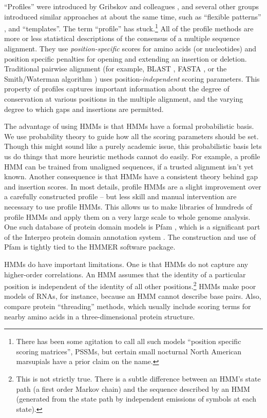 ``Profiles'' were introduced by Gribskov and colleagues
\cite{Gribskov87,Gribskov90}, and several other groups introduced
similar approaches at about the same time, such as ``flexible
patterns'' \cite{Barton90}, and
``templates''\cite{Bashford87,Taylor86}. The term ``profile'' has
stuck.\footnote{There has been some agitation to call all such models
``position specific scoring matrices'', PSSMs, but certain small
nocturnal North American marsupials have a prior claim on the name.}
All of the profile methods are more or less statistical descriptions
of the consensus of a multiple sequence alignment. They use
\emph{position-specific} scores for amino acids (or nucleotides) and
position specific penalties for opening and extending an insertion or
deletion.  Traditional pairwise alignment (for example, BLAST
\cite{Altschul90}, FASTA \cite{Pearson88}, or the Smith/Waterman
algorithm \cite{Smith81}) uses position-{\em independent} scoring
parameters. This property of profiles captures important information
about the degree of conservation at various positions in the multiple
alignment, and the varying degree to which gaps and insertions are
permitted.

The advantage of using HMMs is that HMMs have a formal probabilistic
basis. We use probability theory to guide how all the scoring
parameters should be set. Though this might sound like a purely
academic issue, this probabilistic basis lets us do things that more
heuristic methods cannot do easily. For example, a profile HMM can be
trained from unaligned sequences, if a trusted alignment isn't yet
known. Another consequence is that HMMs have a consistent theory
behind gap and insertion scores. In most details, profile HMMs are a
slight improvement over a carefully constructed profile -- but less
skill and manual intervention are necessary to use profile HMMs.  This
allows us to make libraries of hundreds of profile HMMs and apply them
on a very large scale to whole genome analysis.  One such database of
protein domain models is Pfam \cite{Sonnhammer97,Bateman02}, which is
a significant part of the Interpro protein domain annotation system
\cite{Mulder03}. The construction and use of Pfam is tightly tied to
the HMMER software package.

HMMs do have important limitations. One is that HMMs do not capture
any higher-order correlations.  An HMM assumes that the identity of a
particular position is independent of the identity of all other
positions.\footnote{This is not strictly true. There is a subtle
difference between an HMM's state path (a first order Markov chain)
and the sequence described by an HMM (generated from the state path by
independent emissions of symbols at each state).} HMMs make poor
models of RNAs, for instance, because an HMM cannot describe base
pairs. Also, compare protein ``threading'' methods, which usually
include scoring terms for nearby amino acids in a three-dimensional
protein structure.


